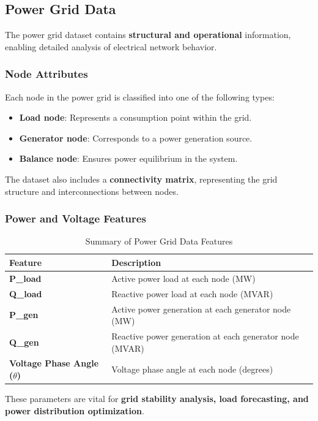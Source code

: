\documentclass[12pt]{article}
\begin{document}
\subsection*{Power Grid Data}
The power grid dataset contains \textbf{structural and operational} information, enabling detailed analysis of electrical network behavior.

\subsubsection*{Node Attributes}
Each node in the power grid is classified into one of the following types:
\begin{itemize}
    \item \textbf{Load node}: Represents a consumption point within the grid.
    \item \textbf{Generator node}: Corresponds to a power generation source.
    \item \textbf{Balance node}: Ensures power equilibrium in the system.
\end{itemize}
The dataset also includes a \textbf{connectivity matrix}, representing the grid structure and interconnections between nodes.

\subsubsection*{Power and Voltage Features}
\begin{table}[h]
    \centering
    \begin{tabular}{ll}
        \toprule
        \textbf{Feature} & \textbf{Description} \\
        \midrule
        \textbf{P\_load} & Active power load at each node (MW) \\
        \textbf{Q\_load} & Reactive power load at each node (MVAR) \\
        \textbf{P\_gen} & Active power generation at each generator node (MW) \\
        \textbf{Q\_gen} & Reactive power generation at each generator node (MVAR) \\
        \textbf{Voltage Phase Angle (\(\theta\))} & Voltage phase angle at each node (degrees) \\
        \bottomrule
    \end{tabular}
    \caption{Summary of Power Grid Data Features}
    \label{tab:grid}
\end{table}

These parameters are vital for \textbf{grid stability analysis, load forecasting, and power distribution optimization}.
\end{document}
